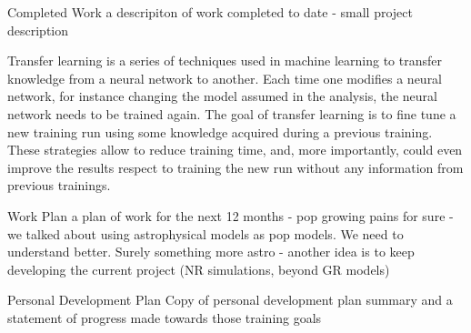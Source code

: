 \documentclass[a4paper, 12pt, twoside, openright, titlepage]{book}
\begin{document}
\begin{chapter}{Completed Work}
a descripiton of work completed to date
- small project description

Transfer learning is a series of techniques used in machine learning to transfer knowledge from a neural network to another.
Each time one modifies a neural network, for instance changing the model assumed in the analysis, the neural network needs to be trained again. 
The goal of transfer learning is to fine tune a new training run using some knowledge acquired during a previous training.
These strategies allow to reduce training time, and, more importantly, could even improve the results respect to training the new run without any information from previous trainings. 




\end{chapter}

\begin{chapter}{Work Plan}
a plan of work for the next 12 months
- pop growing pains for sure
- we talked about using astrophysical models as pop models. We need to understand better. Surely something more astro
- another idea is to keep developing the current project (NR simulations, beyond GR models)
\end{chapter}

\begin{chapter}{Personal Development Plan}
Copy of personal development plan summary and a statement of progress made towards those training goals
\end{chapter}

\appendix
%
%
%

\backmatter

\end{document}

